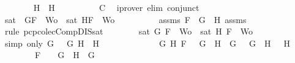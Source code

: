 \begin{isabellebody}
\ \ \ \ \ \ \isamarkupfalse%
\ {\isachardoublequoteopen}H\ {\isacharequal}\ H{}{\isachardoublequoteclose}\isanewline
\ \ \ \ \ \ \ \ \isamarkupfalse%
\ C{}\ \isamarkupfalse%
\ {\isacharparenleft}iprover\ elim{\isacharcolon}\ conjunct{}{\isacharparenright}\isanewline
\ \ \ \ \ \ \isamarkupfalse%
\ {\isachardoublequoteopen}sat\ {\isacharparenleft}{\isacharbraceleft}\isactrlbold {\isasymnot}\ G{}{\isacharcomma}F{\isacharbraceright}\ {\isasymunion}\ Wo{\isacharparenright}\ {\isasymor}\ sat\ {\isacharparenleft}{\isacharbraceleft}H{}{\isacharcomma}F{\isacharbraceright}\ {\isasymunion}\ Wo{\isacharparenright}{\isachardoublequoteclose}\isanewline
\ \ \ \ \ \ \ \ \isamarkupfalse%
\ assms{\isacharparenleft}{}{\isacharparenright}\ {\isacartoucheopen}F\ {\isacharequal}\ G{}\ \isactrlbold {\isasymrightarrow}\ H{}{\isacartoucheclose}\ assms{\isacharparenleft}{}{\isacharcomma}{}{\isacharcomma}{}{\isacharparenright}\ \isamarkupfalse%
\ {\isacharparenleft}rule\ pcp{\isacharunderscore}colecComp{\isacharunderscore}DIS{\isacharunderscore}sat{}{\isacharparenright}\isanewline
\ \ \ \ \ \ \isamarkupfalse%
\ {\isachardoublequoteopen}sat\ {\isacharparenleft}{\isacharbraceleft}G{\isacharcomma}\ F{\isacharbraceright}\ {\isasymunion}\ Wo{\isacharparenright}\ {\isasymor}\ sat\ {\isacharparenleft}{\isacharbraceleft}H{\isacharcomma}\ F{\isacharbraceright}\ {\isasymunion}\ Wo{\isacharparenright}{\isachardoublequoteclose}\isanewline
\ \ \ \ \ \ \ \ \isamarkupfalse%
\ {\isacharparenleft}simp\ only{\isacharcolon}\ {\isacartoucheopen}G\ {\isacharequal}\ \isactrlbold {\isasymnot}\ G{}{\isacartoucheclose}\ {\isacartoucheopen}H\ {\isacharequal}\ H{}{\isacartoucheclose}{\isacharparenright}\ \isanewline
\ \ \ \ \isamarkupfalse%
\isanewline
\ \ \ \ \ \ \isamarkupfalse%
\ {\isachardoublequoteopen}{\isacharparenleft}{\isasymexists}G{}\ H{}{\isachardot}\ F\ {\isacharequal}\ \isactrlbold {\isasymnot}\ {\isacharparenleft}G{}\ \isactrlbold {\isasymand}\ H{}{\isacharparenright}\ {\isasymand}\ G\ {\isacharequal}\ \isactrlbold {\isasymnot}\ G{}\ {\isasymand}\ H\ {\isacharequal}\ \isactrlbold {\isasymnot}\ H{}{\isacharparenright}\ {\isasymor}\ \isanewline
\ \ \ \ \ \ \ \ F\ {\isacharequal}\ \isactrlbold {\isasymnot}\ {\isacharparenleft}\isactrlbold {\isasymnot}\ G{\isacharparenright}\ {\isasymand}\ H\ {\isacharequal}\ G{\isachardoublequoteclose}\isanewline

\end{isabellebody}

